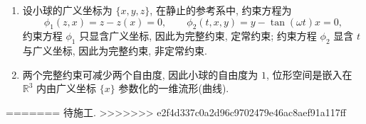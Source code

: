 \begin{solution}
    \begin{enumerate}[label=(\arabic*)]
        \item 设小球的广义坐标为 $\{x, y, z\}$, 在静止的参考系中, 约束方程为
        \[
            \phi_1 (z, x) = z - z(x) = 0, \qquad \phi_2 (t, x, y) = y - \tan (\omega t) x = 0,
        \]
        约束方程 $\phi_1$ 只显含广义坐标, 因此为完整约束, 定常约束; 约束方程 $\phi_2$ 显含 $t$ 与广义坐标, 因此为完整约束, 非定常约束.
        \item 两个完整约束可减少两个自由度, 因此小球的自由度为 $1$, 位形空间是嵌入在 $\mathbb{R}^3$ 内由广义坐标 $\{x\}$ 参数化的一维流形(曲线).
    \end{enumerate}
=======
    待施工.
>>>>>>> e2f4d337c0a2d96c9702479e46ac8aef91a117ff
\end{solution}
